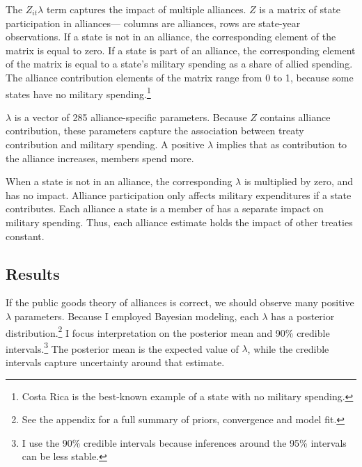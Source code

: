 \documentclass[12pt]{article}
\begin{document}
The $Z_{it} \lambda$ term captures the impact of multiple alliances. 
$Z$ is a matrix of state participation in alliances--- columns are alliances, rows are state-year observations. 
If a state is not in an alliance, the corresponding element of the matrix is equal to zero. 
If a state is part of an alliance, the corresponding element of the matrix is equal to a state's military spending as a share of allied spending. 
The alliance contribution elements of the matrix range from 0 to 1, because some states have no military spending.\footnote{Costa Rica is the best-known example of a state with no military spending.} 


$\lambda$ is a vector of 285 alliance-specific parameters.  
Because $Z$ contains alliance contribution, these parameters capture the association between treaty contribution and military spending. 
A positive $\lambda$ implies that as contribution to the alliance increases, members spend more. 


When a state is not in an alliance, the corresponding $\lambda$ is multiplied by zero, and has no impact. 
Alliance participation only affects military expenditures if a state contributes. 
Each alliance a state is a member of has a separate impact on military spending.
Thus, each alliance estimate holds the impact of other treaties constant.     


\subsection{Results} 


If the public goods theory of alliances is correct, we should observe many positive $\lambda$ parameters. 
Because I employed Bayesian modeling, each $\lambda$ has a posterior distribution.\footnote{See the appendix for a full summary of priors, convergence and model fit.} 
I focus interpretation on the posterior mean and 90\% credible intervals.\footnote{I use the 90\% credible intervals because inferences around the 95\% intervals can be less stable.}
The posterior mean is the expected value of $\lambda$, while the credible intervals capture uncertainty around that estimate.  
\end{document}
